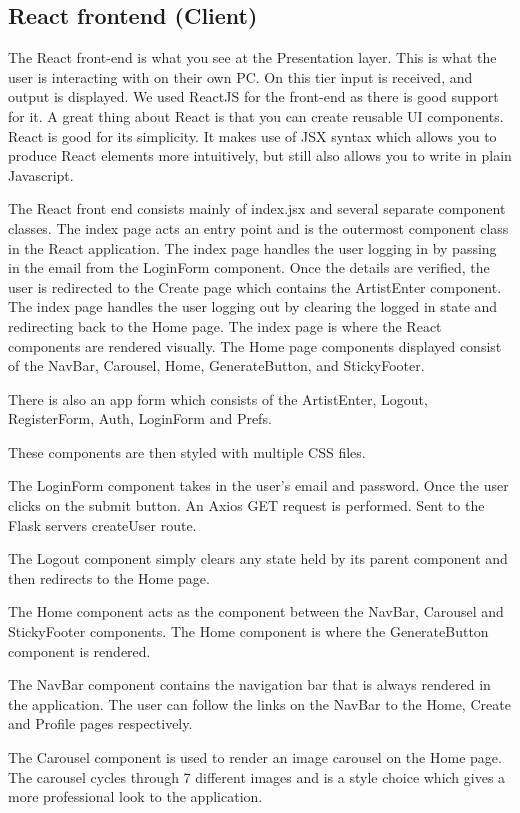 \subsection{React frontend (Client)}
The React front-end is what you see at the Presentation layer. This is what the user is interacting with on their own PC. On this tier input is received, and output is displayed.
We used ReactJS for the front-end as there is good support for it. A great thing about React is that you can create reusable UI components. React is good for its simplicity. It makes use of JSX syntax which allows you to produce React elements more intuitively, but still also allows you to write in plain Javascript.


The React front end consists mainly of index.jsx and several separate component classes. The index page acts an entry point and is the outermost component class in the React application. The index page handles the user logging in by passing in the email from the LoginForm component. Once the details are verified, the user is redirected to the Create page which contains the ArtistEnter component. The index page handles the user logging out by clearing the logged in state and redirecting back to the Home page. 
The index page is where the React components are rendered visually. The Home page components displayed consist of the NavBar, Carousel, Home, GenerateButton, and StickyFooter. 

There is also an app form which consists of the ArtistEnter, Logout, RegisterForm, Auth, LoginForm and Prefs.

These components are then styled with multiple CSS files.


The LoginForm component takes in the user’s email and password. Once the user clicks on the submit button. An Axios GET request is performed. Sent to the Flask servers createUser route.

The Logout component simply clears any state held by its parent component and then redirects to the Home page.

The Home component acts as the component between the NavBar, Carousel and StickyFooter components. The Home component is where the GenerateButton component is rendered.

The NavBar component contains the navigation bar that is always rendered in the application. The user can follow the links on the NavBar to the Home, Create and Profile pages respectively.

The Carousel component is used to render an image carousel on the Home page. The carousel cycles through 7 different images and is a style choice which gives a more professional look to the application.

